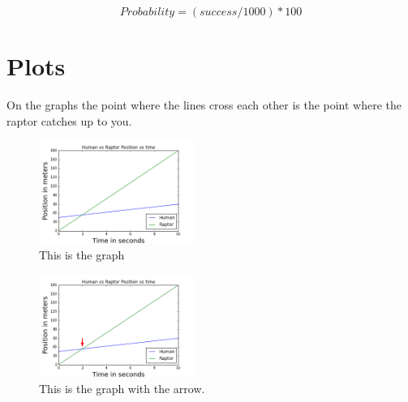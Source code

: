\documentclass[twocolumn]{revtex4}
\begin{document}
$$Probability = (success/1000) * 100$$

\section{Plots}
On the graphs the point where the lines cross each other is the point where the raptor catches up to you.
\begin{figure}[h]
	\centering
	\includegraphics[width=0.45\textwidth]{RaptorVsHuman.png}
	\caption{This is the graph \label{fig:Graph}}
\end{figure}

\begin{figure}[h]
	\centering
	\includegraphics[width=0.45\textwidth]{Arrows.png}
	\caption{This is the graph with the arrow. \label{fig:Graph}}
\end{figure}


\end{document}
